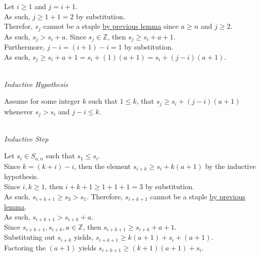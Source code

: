 \documentclass[a4paper,12pt]{article}
\begin{document}
\noindent Let $i \geq 1$ and $j = i + 1$.\\

\noindent As such, $j \geq 1 + 1 = 2$ by substitution.\\

\noindent Therefor, $s_j$ cannot be a staple \hyperlink{lemma:only_staple}{by previous lemma} since $a \geq n$ and $j \geq 2$.\\

\noindent As such, $s_j > s_i + a$. Since $s_j \in \mathbb{Z}$, then $s_j \geq s_i + a + 1$.\\

\noindent Furthermore, $j - i = (i + 1) - i = 1$ by substitution.\\

\noindent As such, $s_j \geq s_i + a + 1 = s_i + (1)(a + 1) = s_i + (j - i)(a + 1)$.


\noindent \\
\textit{Inductive Hypothesis}

\noindent Assume for some integer $k$ such that $1 \leq k$, that $s_j \geq s_i + (j - i)(a + 1)$ whenever $s_j > s_i$ and $j - i \leq k$.


\noindent \\
\textit{Inductive Step}

\noindent Let $s_i \in S_{a, n}$ such that $s_1 \leq s_i$.\\

\noindent Since $k = (k + i) - i$, then the element $s_{i + k} \geq s_i + k(a + 1)$ by the inductive hypothesis.\\

\noindent Since $i, k \geq 1$, then $i + k + 1 \geq 1 + 1 + 1 = 3$ by substitution.\\

\noindent As such, $s_{i + k + 1} \geq s_3 > s_1$. Therefore, $s_{i + k + 1}$ cannot be a staple \hyperlink{lemma:only_staple}{by previous lemma}.\\

\noindent As such, $s_{i + k + 1} > s_{i + k} + a$.\\

\noindent Since $s_{i + k + 1}, s_{i + k}, a \in \mathbb{Z}$, then $s_{i + k + 1} \geq s_{i + k} + a + 1$.\\

\noindent Substituting out $s_{i + k}$ yields, $s_{i + k + 1} \geq k(a + 1) + s_i + (a + 1)$.\\

\noindent Factoring the $(a + 1)$ yields $s_{i + k + 1} \geq (k + 1)(a + 1) + s_i$.\\
\end{document}
